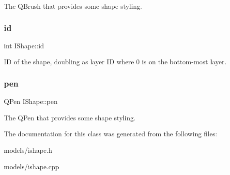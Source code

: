 The Q\+Brush that provides some shape styling. \mbox{\label{class_i_shape_a6ff2d631831c1079b88eeebc8ac65bb0}} 
\subsubsection{\texorpdfstring{id}{id}}
{\footnotesize\ttfamily int I\+Shape\+::id}

ID of the shape, doubling as layer ID where 0 is on the bottom-\/most layer. \mbox{\label{class_i_shape_ab185a01c9703b4db801b54030031a9c6}} 
\subsubsection{\texorpdfstring{pen}{pen}}
{\footnotesize\ttfamily Q\+Pen I\+Shape\+::pen}

The Q\+Pen that provides some shape styling. 

The documentation for this class was generated from the following files\+:\begin{DoxyCompactItemize}
\item 
models/ishape.\+h\item 
models/ishape.\+cpp\end{DoxyCompactItemize}
